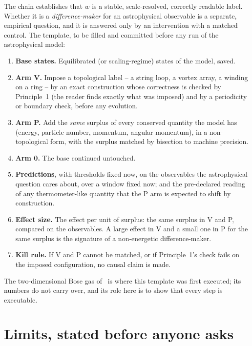 \documentclass[11pt,a4paper]{article}
\begin{document}
The chain establishes that $w$ is a stable, scale-resolved, correctly readable label. Whether it is a
\emph{difference-maker} for an astrophysical observable is a separate, empirical question, and it is
answered only by an intervention with a matched control. The template, to be filled and committed
before any run of the astrophysical model:
\begin{enumerate}[leftmargin=*]
\item \textbf{Base states.} Equilibrated (or scaling-regime) states of the model, saved.
\item \textbf{Arm V.} Impose a topological label -- a string loop, a vortex array, a winding on a
  ring -- by an exact construction whose correctness is checked by Principle~1 (the reader finds
  exactly what was imposed) and by a periodicity or boundary check, before any evolution.
\item \textbf{Arm P.} Add the \emph{same} surplus of every conserved quantity the model has (energy,
  particle number, momentum, angular momentum), in a non-topological form, with the surplus
  matched by bisection to machine precision.
\item \textbf{Arm 0.} The base continued untouched.
\item \textbf{Predictions}, with thresholds fixed now, on the observables the astrophysical question
  cares about, over a window fixed now; and the pre-declared reading of any thermometer-like
  quantity that the P arm is expected to shift by construction.
\item \textbf{Effect size.} The effect per unit of surplus: the same surplus in V and P, compared on
  the observables. A large effect in V and a small one in P for the same surplus is the signature of
  a non-energetic difference-maker.
\item \textbf{Kill rule.} If V and P cannot be matched, or if Principle~1's check fails on the
  imposed configuration, no causal claim is made.
\end{enumerate}
The two-dimensional Bose gas of~\cite{Callens2026Causal} is where this template was first executed;
its numbers do not carry over, and its role here is to show that every step is executable.

\section{Limits, stated before anyone asks}\label{sec:limits}
\end{document}
